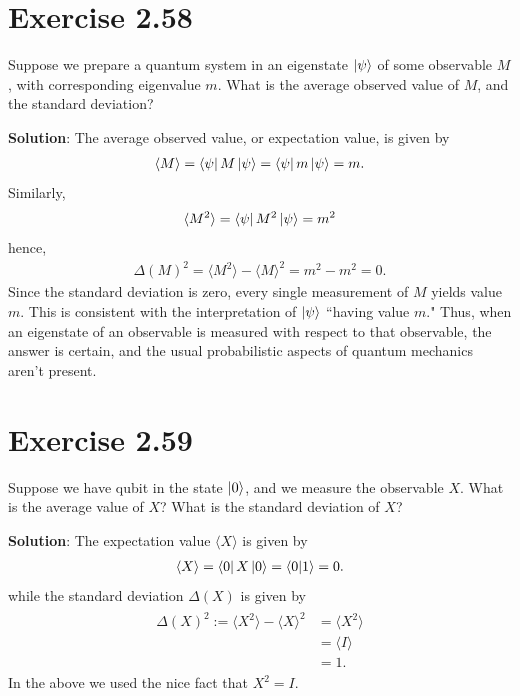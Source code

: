 \documentclass{book}
\begin{document}
\section*{Exercise 2.58}
    Suppose we prepare a quantum system in an eigenstate $\ket{\psi}$ of some observable $M$ , with corresponding eigenvalue $m$. What is the average observed value of $M$, and the standard deviation?

    \textbf{Solution}: The average observed value, or expectation value, is given by
    \begin{align}
        \langle M\rangle = \bra{\psi}M\ket{\psi} = \bra{\psi}m\ket{\psi} = m.
    \end{align}
    Similarly,
    \begin{align}
        \langle M^2 \rangle = \bra{\psi}M^2\ket{\psi} = m^2
    \end{align}
    hence,
    \begin{align}
        \Delta(M)^2 = \langle M^2 \rangle - \langle M \rangle ^2  = m^2 - m^2 = 0.
    \end{align}
    Since the standard deviation is zero, every single measurement of $M$ yields value $m$. This is consistent with the interpretation of $\ket{\psi}$ ``having value $m$." Thus, when an eigenstate of an observable is measured with respect to that observable, the answer is certain, and the usual probabilistic aspects of quantum mechanics aren't present.

\section*{Exercise 2.59}
    Suppose we have qubit in the state $\ket{0}$, and we measure the observable $X$. What is the average value of $X$? What is the standard deviation of $X$?

    \textbf{Solution}: The expectation value $\langle X \rangle$ is given by
    \begin{align}
        \langle X \rangle = \bra{0} X \ket{0} = \bra{0} \ket{1} = 0.
    \end{align}
    while the standard deviation $\Delta(X)$ is given by
    \begin{align}
    \begin{aligned}
        \Delta(X)^2 := \langle X^2 \rangle - \langle X \rangle^2 &= \langle X^2 \rangle \\
        &= \langle I \rangle \\
        &= 1.
    \end{aligned}
    \end{align}
    In the above we used the nice fact that $X^2 = I$.
\end{document}
